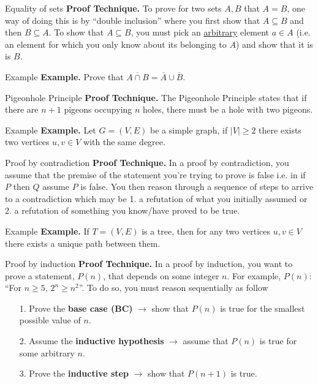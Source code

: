 \documentclass[10pt]{beamer}
\begin{document}
\begin{frame}{Equality of sets}
    \textbf{Proof Technique.} To prove for two sets $A, B$ that $A = B$, one way of doing this is by ``double inclusion'' where you first show that $A \subseteq B$ and then $B \subseteq A$. To show that $A \subseteq B$, you must pick an \underline{arbitrary} element $a \in A$ (i.e. an element for which you only know about its belonging to $A$) and show that it is is $B$.
\end{frame}

\begin{frame}[t]{Example}
    \textbf{Example.} Prove that $\overline{A \cap B} = \overline{A} \cup \overline{B}$.
\end{frame}

\begin{frame}{Pigeonhole Principle}
    \textbf{Proof Technique.} The Pigeonhole Principle states that if there are $n+1$ pigeons occupying $n$ holes, there must be a hole with two pigeons.
\end{frame}

\begin{frame}[t]{Example}
    \textbf{Example.} Let $G = (V, E)$ be a simple graph, if $|V| \geq 2$ there exists two vertices $u, v \in V$ with the same degree.
\end{frame}

\begin{frame}{Proof by contradiction}
    \textbf{Proof Technique.} In a proof by contradiction, you assume that the premise of the statement you're trying to prove is false i.e. in if $P$ then $Q$ assume $P$ is false. You then reason through a sequence of steps to arrive to a contradiction which may be 1. a refutation of what you initially assumed or 2. a refutation of something you know/have proved to be true.
\end{frame}

\begin{frame}[t]{Example}
    \textbf{Example.} If $T = (V, E)$ is a tree, then for any two vertices $u, v \in V$ there exists a unique path between them.
\end{frame}

\begin{frame}{Proof by induction}
    \textbf{Proof Technique.} In a proof by induction, you want to prove a statement, $P(n)$, that depends on some integer $n$. For example, $P(n): $ ``For $n \geq 5$, $2^n \geq n^2$''. To do so, you must reason sequentially as follow
    \begin{itemize}
        \item[1.] Prove the \textbf{base case (BC)} $\rightarrow$ show that $P(n)$ is true for the smallest possible value of $n$.
        \item[2.] Assume the \textbf{inductive hypothesis} $\rightarrow$ assume that $P(n)$ is true for some arbitrary $n$.
        \item[3.] Prove the \textbf{inductive step} $\rightarrow$ show that $P(n+1)$ is true.
    \end{itemize}
\end{frame}
\end{document}
